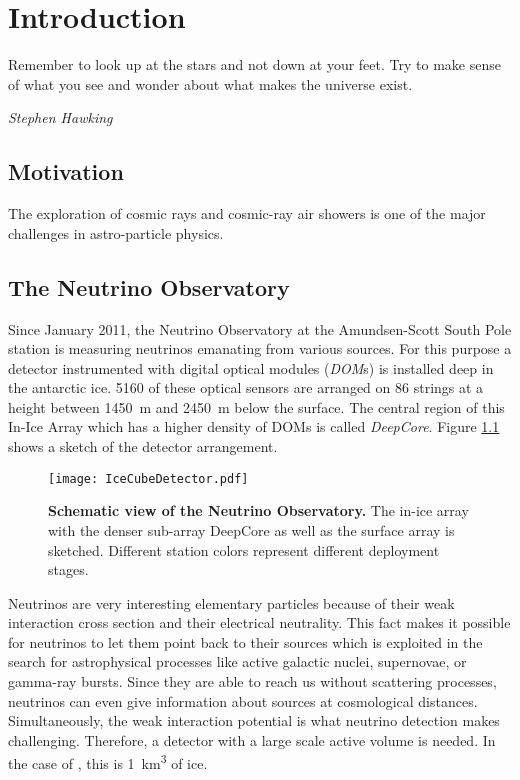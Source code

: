 \chapter{Introduction}

\epigraph{\frqq Remember to look up at the stars and not down at your feet. Try to make sense of what you see and wonder about what makes the universe exist.\flqq}{\textit{Stephen Hawking}}

\section{Motivation}

The exploration of cosmic rays and cosmic-ray air showers is one of the major challenges in astro-particle physics. 

\section{The \icecube Neutrino Observatory}

Since January 2011, the \icecube Neutrino Observatory at the Amundsen-Scott South Pole station is measuring neutrinos emanating from various sources. For this purpose a detector instrumented with digital optical modules (\textit{DOM}s) is installed deep in the antarctic ice. 5160 of these optical sensors are arranged on 86 strings at a height between \SI{1450}{\meter} and \SI{2450}{\meter} below the surface. The central region of this In-Ice Array which has a higher density of DOMs is called \textit{DeepCore}. Figure \ref{icecube:detector} shows a sketch of the detector arrangement.\\

\begin{figure}[h]
	\texttt{[image: IceCubeDetector.pdf]}
	\caption[Schematic view of \icecube]{\textbf{Schematic view of the \icecube Neutrino Observatory.} \cite{icecube:instrumentation} The in-ice array with the denser sub-array DeepCore as well as the surface array \icetop is sketched. Different station colors represent different deployment stages.}
	\label{icecube:detector}
\end{figure}

Neutrinos are very interesting elementary particles because of their weak interaction cross section and their electrical neutrality. This fact makes it possible for neutrinos to let them point back to their sources which is exploited in the search for astrophysical processes like active galactic nuclei, supernovae, or gamma-ray bursts. Since they are able to reach us without scattering processes, neutrinos can even give information about sources at cosmological distances. Simultaneously, the weak interaction potential is what neutrino detection makes challenging. Therefore, a detector with a large scale active volume is needed. In the case of \icecube, this is \SI{1}{\cubic\kilo\meter} of ice.\\

